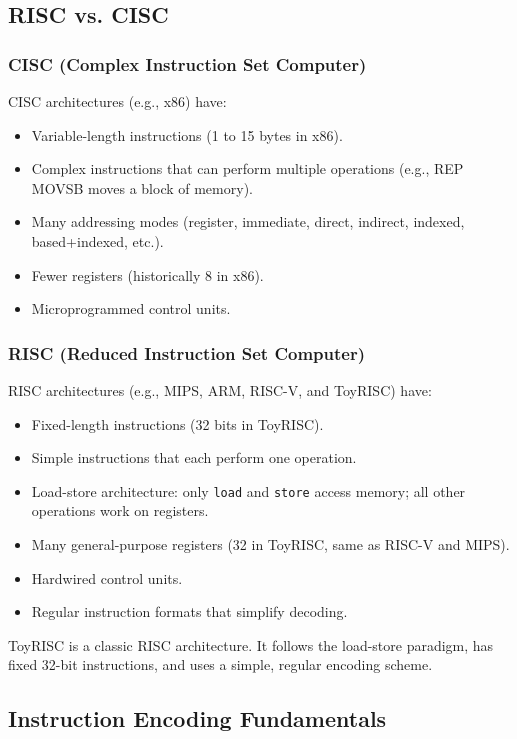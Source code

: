 \documentclass[12pt,a4paper]{article}
\begin{document}
\subsection{RISC vs. CISC}

\subsubsection{CISC (Complex Instruction Set Computer)}

CISC architectures (e.g., x86) have:
\begin{itemize}
    \item Variable-length instructions (1 to 15 bytes in x86).
    \item Complex instructions that can perform multiple operations (e.g., REP MOVSB moves a block of memory).
    \item Many addressing modes (register, immediate, direct, indirect, indexed, based+indexed, etc.).
    \item Fewer registers (historically 8 in x86).
    \item Microprogrammed control units.
\end{itemize}

\subsubsection{RISC (Reduced Instruction Set Computer)}

RISC architectures (e.g., MIPS, ARM, RISC-V, and ToyRISC) have:
\begin{itemize}
    \item Fixed-length instructions (32 bits in ToyRISC).
    \item Simple instructions that each perform one operation.
    \item Load-store architecture: only \texttt{load} and \texttt{store} access memory; all other operations work on registers.
    \item Many general-purpose registers (32 in ToyRISC, same as RISC-V and MIPS).
    \item Hardwired control units.
    \item Regular instruction formats that simplify decoding.
\end{itemize}

ToyRISC is a classic RISC architecture. It follows the load-store paradigm, has fixed 32-bit instructions, and uses a simple, regular encoding scheme.

\subsection{Instruction Encoding Fundamentals}
\end{document}
